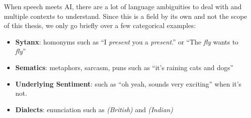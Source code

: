 When speech meets AI, there are a lot of language ambiguities to deal with and multiple contexts to understand. Since this is a field by its own and not the scope of this thesis, we only go briefly over a few categorical examples:
\begin{itemize}
	\item \textbf{Sytanx}: homonyms such as ``I \textit{present} you a \textit{present}.'' or ``The \textit{fly} wants to \textit{fly}''
	
	\item \textbf{Sematics}: metaphors, sarcasm, puns such as ``it’s raining cats and dogs''
	
	\item \textbf{Underlying Sentiment}: such as ``oh yeah, sounds very exciting'' when it's not.
	
	\item \textbf{Dialects}: enunciation such as \textipa{[dI"vE|9pm9nt]} \textit{(British)} and \textipa{[d9v"|Apm9nt]} \textit{(Indian)}

\end{itemize}

%
%	
%



